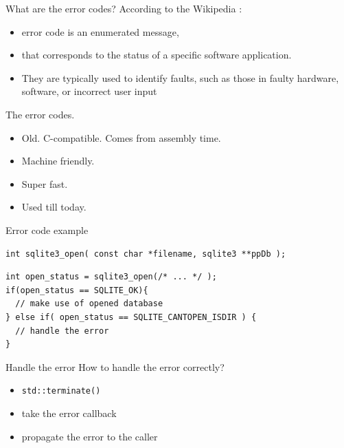 \documentclass[10pt]{beamer}
\begin{document}
\begin{frame}{What are the error codes?}
	According to the \alert{Wikipedia} :
	\begin{itemize}[<+- | alert@+>]
		\item error code is an enumerated message,
		\item that corresponds to the status of a specific software application.
		\item They are typically used to identify faults, such as those in faulty hardware, software, or incorrect user input
	\end{itemize}
\end{frame}

\begin{frame}{The error codes.}
	\begin{itemize}[<+- | alert@+>]
		\item Old. C-compatible. Comes from assembly time.
		\item Machine friendly.
		\item Super fast.
		\item Used till today.
	\end{itemize}
\end{frame}

\begin{frame}[fragile]{Error code example}
	\begin{verbatim}
int sqlite3_open( const char *filename, sqlite3 **ppDb );
	\end{verbatim}
	
	\pause
	
	\hrulefill
	
	\begin{verbatim}
int open_status = sqlite3_open(/* ... */ );
if(open_status == SQLITE_OK){
  // make use of opened database
} else if( open_status == SQLITE_CANTOPEN_ISDIR ) {
  // handle the error
}
	\end{verbatim}
	
\end{frame}

\begin{frame}{Handle the error}
	How to handle the error correctly?
	
	\pause
	
	\begin{itemize}[<+- | alert@+>]
		\item \texttt{std::terminate()}
		\item take the error callback
		\item propagate the error to the caller
	\end{itemize}
	
\end{frame}
\end{document}
